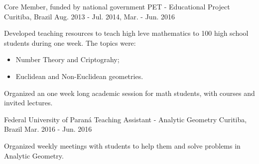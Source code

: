 \begin{cventries}
  \cventry
    {Core Member, funded by national government} %
    {PET - Educational Project} %
    {Curitiba, Brazil} %
    {Aug. 2013 - Jul. 2014, Mar. - Jun. 2016} %
    {
      \begin{cvitems} %
        \item {Developed teaching resources to teach high leve mathematics
        to 100 high school students during one week. The topics were:
        \begin{itemize}
          \item Number Theory and Criptograhy;
          \item Euclidean and Non-Euclidean geometries.
        \end{itemize}}
        \item {Organized an one week long academic session for math students,
        with courses and invited lectures.}
      \end{cvitems}
    }

  \cventry
    {Federal University of Paraná} %
    {Teaching Assistant - Analytic Geometry} %
    {Curitiba, Brazil} %
    {Mar. 2016 - Jun. 2016} %
    {
      \begin{cvitems} %
        \item {Organized weekly meetings with students to help them and solve
        problems in Analytic Geometry.}
      \end{cvitems}
    }

\end{cventries}
